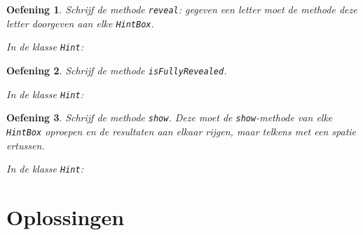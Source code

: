 \documentclass[a4paper,dutch]{article}
\newtheorem{exercise}{Oefening}[section]
\newcommand{\code}[2][]{
  
}
\begin{document}
\begin{exercise}
Schrijf de methode {\tt reveal}: gegeven een letter moet de methode deze letter
doorgeven aan elke {\tt HintBox}.
\begin{solution}
In de klasse {\tt Hint}:
\code{hint-reveal.java}
\end{solution}
\end{exercise}

\begin{exercise}
Schrijf de methode {\tt isFullyRevealed}.
\begin{solution}
In de klasse {\tt Hint}:
\code{hint-isfullyrevealed.java}
\end{solution}
\end{exercise}

\begin{exercise}
Schrijf de methode {\tt show}. Deze moet de {\tt show}-methode van elke {\tt HintBox}
oproepen en de resultaten aan elkaar rijgen, maar telkens met een spatie ertussen.
\begin{solution}
In de klasse {\tt Hint}:
\code{hint-show.java}
\end{solution}
\end{exercise}

\clearpage
\section{Oplossingen}

\end{document}
